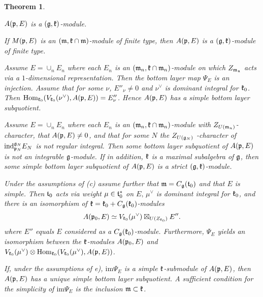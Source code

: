 \documentclass[12pt]{article}
\newcounter{theorem}
\newtheorem{theo}{Theorem}[section]
\newcommand{\kk}{\mathfrak{k}}
\newcommand{\ind}{\mathrm{ind}}
\def\ind{\text{\rm ind}}
\def\Hom{\text{\rm Hom}}
\def\k{\frak k}
\begin{document}
\begin{theo}\label{th22}

\item[(a)]  $A(\frak p, E)$ is a $(\frak g,\frak k)$-module.

\item[(b)]  If $M(\frak p, E)$ is an $(\frak m, \frak k\cap\frak m)$-module of finite type, then $A(\frak p, E)$ is a $(\frak g, \frak k)$-module of finite type.

\item[(c)] Assume $E = \cup_nE_n$ where each $E_n$ is an $(\frak m_n, \kk\cap\frak m_n)$-module on which $Z_{\frak m_{\frak n}}$ acts via a $1$-dimensional representation.  Then the bottom layer map $\Psi_E$ is an injection.  Assume that for some $\nu$, $E''_\nu\neq 0$ and $\nu^{\vee}$ is dominant integral for $\k_0$. Then $\Hom_{\frak k_{0}} (V_{\frak k_{0}}(\nu^{\vee}), A(\frak p, E)) =  E''_\nu$. Hence $A(\frak p, E)$ has a simple bottom layer subquotient.

\item[(d)]  Assume $E = \cup_n E_n$ where each $E_n$ is an $(\frak m_n, \kk\cap\frak m_n)$-module with $Z_{U(\frak m_{n})}$-character, that $A(\frak p,E)\neq 0$, and that for some $N$ the $Z_{U(\frak g_{N})}$ -character of $\ind^{\frak g_{N}}_{\frak p_{N}} E_N$ is not regular integral.  Then some bottom layer subquotient of $A(\frak p, E)$ is not an integrable $\frak g$-module.  If in addition, $\frak k$ is a maximal subalgebra of $\frak g$, then some simple bottom layer subquotient of $A(\frak p, E)$ is a strict $(\frak g, \frak k)$-module.

\item[(e)] Under the assumptions of (c) assume further that $\frak m = C_{\frak g} (\frak t_0)$ and that $E$ is simple. Then $\frak t_0$ acts via weight $\mu\in\frak t^*_0$ on $E, \, \mu^{\vee}$ is dominant integral for $\frak k_0$, and there is an isomorphism of $\frak k =\frak k_0 + C_{\frak g} (\frak k_0)$-modules
$$
A(\frak p_0, E)\simeq V_{\frak k_{0}} (\mu^{\vee})\boxtimes_{U(Z_{\frak k_{0}})} E''.
$$
where $E''$ equals $E$ considered as a $C_{\frak g} (\frak k_0)$-module.  Furthermore, $\Psi_E$ yields an isomorphism between the $\frak k$-modules $A(\frak p_0, E)$ and $V_{\frak k_{0}} (\mu^{\vee})\otimes \Hom_{\frak k_{0}} (V_{\frak k_{0}} (\mu^{\vee}), A(\frak p,E))$.

\item[(f)] If, under the assumptions of e), $\mathrm{im} \Psi_E$ is a simple $\frak k$-submodule of $A(\frak p,E)$, then $A(\frak p,E)$ has a unique simple bottom layer subquotient.  A sufficient condition for the simplicity of $\mathrm{im} \Psi_E$ is the inclusion $\frak m\subset\frak k$.
\end{theo}
\end{document}
